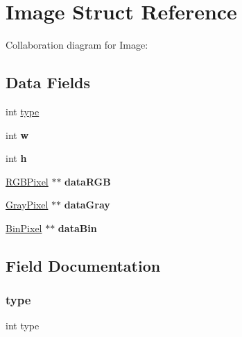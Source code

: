 \hypertarget{struct_image}{}\section{Image Struct Reference}
\label{struct_image}


Collaboration diagram for Image\+:
\subsection*{Data Fields}
\begin{DoxyCompactItemize}
\item 
int \hyperlink{struct_image_ac765329451135abec74c45e1897abf26}{type}
\item 
\mbox{\label{struct_image_aac374e320caaadeca4874add33b62af2}} 
int {\bfseries w}
\item 
\mbox{\label{struct_image_a16611451551e3d15916bae723c3f59f7}} 
int {\bfseries h}
\item 
\mbox{\label{struct_image_a17be49275cd2d8f2661bf68da948f744}} 
\hyperlink{struct_r_g_b_pixel}{R\+G\+B\+Pixel} $\ast$$\ast$ {\bfseries data\+R\+GB}
\item 
\mbox{\label{struct_image_a6af78e02eb272e20e0700a30c5016d47}} 
\hyperlink{struct_gray_pixel}{Gray\+Pixel} $\ast$$\ast$ {\bfseries data\+Gray}
\item 
\mbox{\label{struct_image_a80b23b005b66c6aaed8fe652f1f5fbf8}} 
\hyperlink{struct_bin_pixel}{Bin\+Pixel} $\ast$$\ast$ {\bfseries data\+Bin}
\end{DoxyCompactItemize}


\subsection{Field Documentation}
\mbox{\label{struct_image_ac765329451135abec74c45e1897abf26}} 
\subsubsection{\texorpdfstring{type}{type}}
{\footnotesize\ttfamily int type}

